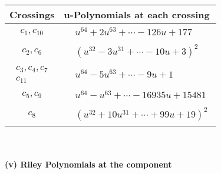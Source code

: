 \documentclass[1p]{elsarticle_modified}
\theoremstyle{definition}
\begin{document}
\begin{tabular}{m{50pt}|m{274pt}}
Crossings & \hspace{64pt}u-Polynomials at each crossing \\
\hline $$\begin{aligned}c_{1},c_{10}\end{aligned}$$&$\begin{aligned}
&u^{64}+2 u^{63}+\cdots-126 u+177
\end{aligned}$\\
\hline $$\begin{aligned}c_{2},c_{6}\end{aligned}$$&$\begin{aligned}
&(u^{32}-3 u^{31}+\cdots-10 u+3)^{2}
\end{aligned}$\\
\hline $$\begin{aligned}c_{3},c_{4},c_{7}\\c_{11}\end{aligned}$$&$\begin{aligned}
&u^{64}-5 u^{63}+\cdots-9 u+1
\end{aligned}$\\
\hline $$\begin{aligned}c_{5},c_{9}\end{aligned}$$&$\begin{aligned}
&u^{64}- u^{63}+\cdots-16935 u+15481
\end{aligned}$\\
\hline $$\begin{aligned}c_{8}\end{aligned}$$&$\begin{aligned}
&(u^{32}+10 u^{31}+\cdots+99 u+19)^{2}
\end{aligned}$\\
\hline
\end{tabular}\\~\\
\newpage\renewcommand{\arraystretch}{1}
\flushleft \textbf{(v) Riley Polynomials at the component}\newline \\
\end{document}
